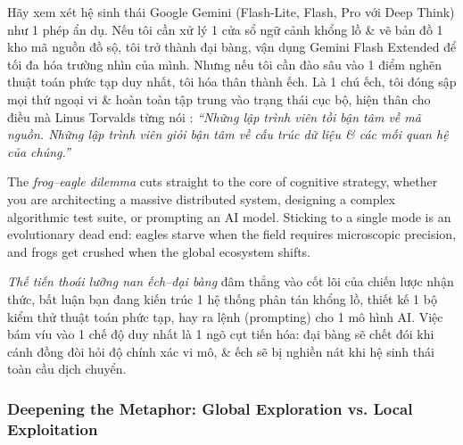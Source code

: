 \documentclass{article}
\begin{document}
Hãy xem xét hệ sinh thái Google Gemini (Flash-Lite, Flash, Pro với Deep Think) như 1 phép ẩn dụ. Nếu tôi cần xử lý 1 cửa sổ ngữ cảnh khổng lồ \& vẽ bản đồ 1 kho mã nguồn đồ sộ, tôi trở thành đại bàng, vận dụng Gemini Flash Extended để tối đa hóa trường nhìn của mình. Nhưng nếu tôi cần đào sâu vào 1 điểm nghẽn thuật toán phức tạp duy nhất, tôi hóa thân thành ếch. Là 1 chú ếch, tôi đóng sập mọi thứ ngoại vi \& hoàn toàn tập trung vào trạng thái cục bộ, hiện thân cho điều mà Linus Torvalds từng nói \cite{torvalds2006good}: \textit{``Những lập trình viên tồi bận tâm về mã nguồn. Những lập trình viên giỏi bận tâm về cấu trúc dữ liệu \& các mối quan hệ của chúng.''}

\vspace{0.5em}
The \textit{frog--eagle dilemma} cuts straight to the core of cognitive strategy, whether you are architecting a massive distributed system, designing a complex algorithmic test suite, or prompting an AI model. Sticking to a single mode is an evolutionary dead end: eagles starve when the field requires microscopic precision, and frogs get crushed when the global ecosystem shifts.

\textit{Thế tiến thoái lưỡng nan ếch--đại bàng} đâm thẳng vào cốt lõi của chiến lược nhận thức, bất luận bạn đang kiến trúc 1 hệ thống phân tán khổng lồ, thiết kế 1 bộ kiểm thử thuật toán phức tạp, hay ra lệnh (prompting) cho 1 mô hình AI. Việc bám víu vào 1 chế độ duy nhất là 1 ngõ cụt tiến hóa: đại bàng sẽ chết đói khi cánh đồng đòi hỏi độ chính xác vi mô, \& ếch sẽ bị nghiền nát khi hệ sinh thái toàn cầu dịch chuyển.

\subsubsection{Deepening the Metaphor: Global Exploration vs. Local Exploitation}
\end{document}
